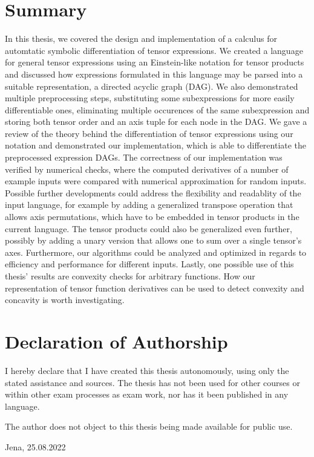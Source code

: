 \documentclass[12pt, a4paper]{report}
\begin{document}
\chapter{Summary}
In this thesis, we covered the design and implementation of a calculus for automtatic symbolic differentiation of tensor expressions.
We created a language for general tensor expressions using an Einstein-like notation for tensor products and discussed how expressions formulated in this language may be parsed into a suitable representation, a directed acyclic graph (DAG).
We also demonstrated multiple preprocessing steps, substituting some subexpressions for more easily differentiable ones, eliminating multiple occurences of the same subexpression and storing both tensor order and an axis tuple for each node in the DAG.
We gave a review of the theory behind the differentiation of tensor expressions using our notation and demonstrated our implementation, which is able to differentiate the preprocessed expression DAGs.
The correctness of our implementation was verified by numerical checks, where the computed derivatives of a number of example inputs were compared with numerical approximation for random inputs. %
Possible further developments could address the flexibility and readablity of the input language, for example by adding a generalized transpose operation that allows axis permutations, which have to be embedded in tensor products in the current language.
The tensor products could also be generalized even further, possibly by adding a unary version that allows one to sum over a single tensor's axes.
Furthermore, our algorithms could be analyzed and optimized in regards to efficiency and performance for different inputs.
Lastly, one possible use of this thesis' results are convexity checks for arbitrary functions.
How our representation of tensor function derivatives can be used to detect convexity and concavity is worth investigating.
\printbibliography

\chapter*{Declaration of Authorship}
I hereby declare that I have created this thesis autonomously, using only the stated assistance and sources.
The thesis has not been used for other courses or within other exam processes as exam work, nor has it been published in any language.

\setlength{\parindent}{0pt}
\vspace{10pt}
The author does not object to this thesis being made available for public use. \vspace{50pt}

Jena, 25.08.2022
\end{document}

